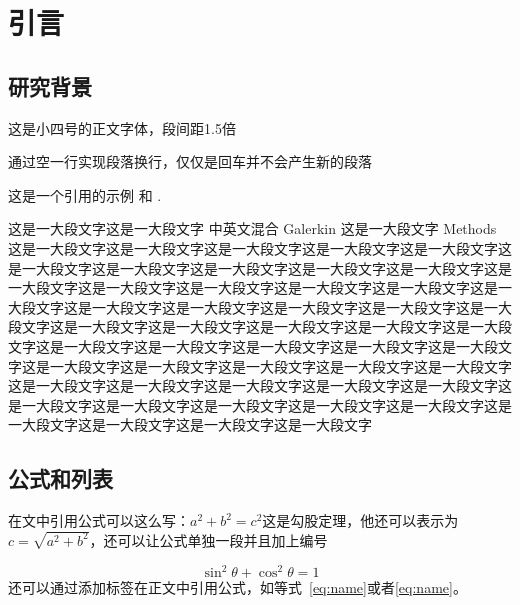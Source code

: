 \documentclass{shnuthesis}
\begin{document}
    \maketoc


	\clearpage %


\chapter{引言}


\section{研究背景}

这是小四号的正文字体，段间距1.5倍
	
通过空一行实现段落换行，仅仅是回车并不会产生新的段落

这是一个引用的示例 \cite{Adams1975}和 \cite{Shen1994, Tadmor2012}.

这是一大段文字这是一大段文字 中英文混合 Galerkin 这是一大段文字 Methods 这是一大段文字这是一大段文字这是一大段文字这是一大段文字这是一大段文字这是一大段文字这是一大段文字这是一大段文字这是一大段文字这是一大段文字这是一大段文字这是一大段文字这是一大段文字这是一大段文字这是一大段文字这是一大段文字这是一大段文字这是一大段文字这是一大段文字这是一大段文字这是一大段文字这是一大段文字这是一大段文字这是一大段文字这是一大段文字这是一大段文字这是一大段文字这是一大段文字这是一大段文字这是一大段文字这是一大段文字这是一大段文字这是一大段文字这是一大段文字这是一大段文字这是一大段文字这是一大段文字这是一大段文字这是一大段文字这是一大段文字这是一大段文字这是一大段文字这是一大段文字这是一大段文字这是一大段文字这是一大段文字这是一大段文字这是一大段文字这是一大段文字这是一大段文字


\section{公式和列表}

在文中引用公式可以这么写：$a^2+b^2=c^2$这是勾股定理，他还可以表示为$c=\sqrt{a^2+b^2}$，还可以让公式单独一段并且加上编号

\begin{equation}
\sin^2{\theta}+\cos^2{\theta}=1 \label{eq:name}
\end{equation}
还可以通过添加标签在正文中引用公式，如等式~\eqref{eq:name}或者\ref{eq:name}。
\end{document}
